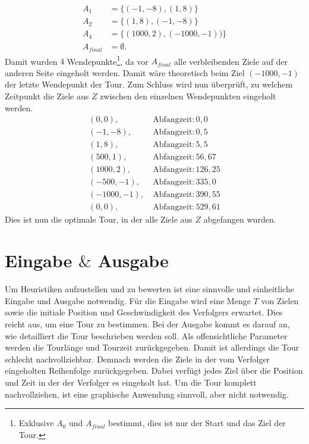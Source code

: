 \documentclass[german,version-2019-11]{uzl-thesis}
\begin{document}
\begin{example}
\begin{align*}
A_1&=\{(-1, -8), (1, 8)\}\\
A_2&=\{(1, 8), (-1, -8)\}\\ 
A_4&=\{(1000, 2), (-1000, -1))\}\\
A_{final}&=\emptyset.
\end{align*}
Damit wurden $4$ Wendepunkte\footnote{Exklusive $A_0$ und $A_{final}$ bestimmt, dies ist nur der Start und das Ziel der Tour.}, da vor $A_{final}$ alle verbleibenden Ziele auf der anderen Seite eingeholt werden. Damit wäre theoretisch beim Ziel $(-1000,-1)$ der letzte Wendepunkt der Tour. Zum Schluss wird nun überprüft, zu welchem Zeitpunkt die Ziele aus $Z$ zwischen den einzelnen Wendepunkten eingeholt werden.
\begin{align*}
(0, 0),~ &\text{Abfangzeit}: 0,0 \\
(-1, -8),~ &\text{Abfangzeit}: 0,5 \\
(1, 8),~ &\text{Abfangzeit}: 5,5 \\
(500, 1),~ &\text{Abfangzeit}: 56,67 \\
(1000, 2),~ &\text{Abfangzeit}: 126,25 \\
(-500, -1),~ &\text{Abfangzeit}: 335,0 \\
(-1000, -1),~ &\text{Abfangzeit}: 390,55 \\
(0, 0),~ &\text{Abfangzeit}: 529,61
\end{align*}
Dies ist nun die optimale Tour, in der alle Ziele aus $Z$ abgefangen wurden.

\end{example}

\section{Eingabe $\&$ Ausgabe}

Um Heuristiken aufzustellen und zu bewerten ist eine sinnvolle und einheitliche Eingabe und Ausgabe notwendig. Für die Eingabe wird eine Menge $T$ von Zielen sowie die initiale Position und Geschwindigkeit des Verfolgers erwartet. Dies reicht aus, um eine Tour zu bestimmen. 
Bei der Ausgabe kommt es darauf an, wie detailliert die Tour beschrieben werden soll. Als offensichtliche Parameter werden die Tourlänge und Tourzeit zurückgegeben. Damit ist allerdings die Tour schlecht nachvollziehbar. Demnach werden die Ziele in der vom Verfolger eingeholten Reihenfolge zurückgegeben. Dabei verfügt jedes Ziel über die Position und Zeit in der der Verfolger es eingeholt hat. Um die Tour komplett nachvollziehen, ist eine graphische Anwendung sinnvoll, aber nicht notwendig. 
\end{document}
